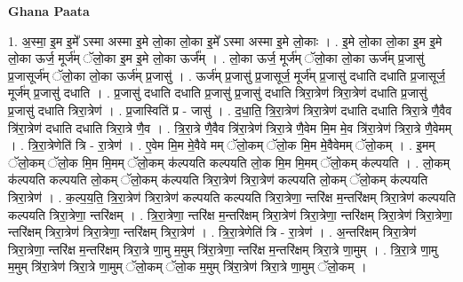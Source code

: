 \documentclass[17pt]{extarticle}
\begin{document}
\textbf{Ghana Paata } \newline

1. अ॒स्मा॒ इ॒म इ॒मे᳚ ऽस्मा अस्मा इ॒मे लो॒का लो॒का इ॒मे᳚ ऽस्मा अस्मा इ॒मे लो॒काः । . इ॒मे लो॒का लो॒का इ॒म इ॒मे लो॒का ऊर्ज॒ मूर्ज॑म् ॅलो॒का इ॒म इ॒मे लो॒का ऊर्ज᳚म् । . लो॒का ऊर्ज॒ मूर्ज॑म् ॅलो॒का लो॒का ऊर्ज॑म् प्र॒जासु॑ प्र॒जासूर्ज॑म् ॅलो॒का लो॒का ऊर्ज॑म् प्र॒जासु॑ । . ऊर्ज॑म् प्र॒जासु॑ प्र॒जासूर्ज॒ मूर्ज॑म् प्र॒जासु॑ दधाति दधाति प्र॒जासूर्ज॒ मूर्ज॑म् प्र॒जासु॑ दधाति । . प्र॒जासु॑ दधाति दधाति प्र॒जासु॑ प्र॒जासु॑ दधाति त्रिरा॒त्रेण॑ त्रिरा॒त्रेण॑ दधाति प्र॒जासु॑ प्र॒जासु॑ दधाति त्रिरा॒त्रेण॑ । . प्र॒जास्विति॑ प्र - जासु॑ । . द॒धा॒ति॒ त्रि॒रा॒त्रेण॑ त्रिरा॒त्रेण॑ दधाति दधाति त्रिरा॒त्रे णै॒वैव त्रि॑रा॒त्रेण॑ दधाति दधाति त्रिरा॒त्रे णै॒व । . त्रि॒रा॒त्रे णै॒वैव त्रि॑रा॒त्रेण॑ त्रिरा॒त्रे णै॒वेम मि॒म मे॒व त्रि॑रा॒त्रेण॑ त्रिरा॒त्रे णै॒वेमम् । . त्रि॒रा॒त्रेणेति॑ त्रि - रा॒त्रेण॑ । . ए॒वेम मि॒म मे॒वैवे मम् ॅलो॒कम् ॅलो॒क मि॒म मे॒वैवेमम् ॅलो॒कम् । . इ॒मम् ॅलो॒कम् ॅलो॒क मि॒म मि॒मम् ॅलो॒कम् क॑ल्पयति कल्पयति लो॒क मि॒म मि॒मम् ॅलो॒कम् क॑ल्पयति । . लो॒कम् क॑ल्पयति कल्पयति लो॒कम् ॅलो॒कम् क॑ल्पयति त्रिरा॒त्रेण॑ त्रिरा॒त्रेण॑ कल्पयति लो॒कम् ॅलो॒कम् क॑ल्पयति त्रिरा॒त्रेण॑ । . क॒ल्प॒य॒ति॒ त्रि॒रा॒त्रेण॑ त्रिरा॒त्रेण॑ कल्पयति कल्पयति त्रिरा॒त्रेणा॒ न्तरि॑क्ष म॒न्तरि॑क्षम् त्रिरा॒त्रेण॑ कल्पयति कल्पयति त्रिरा॒त्रेणा॒ न्तरि॑क्षम् । . त्रि॒रा॒त्रेणा॒ न्तरि॑क्ष म॒न्तरि॑क्षम् त्रिरा॒त्रेण॑ त्रिरा॒त्रेणा॒ न्तरि॑क्षम् त्रिरा॒त्रेण॑ त्रिरा॒त्रेणा॒ न्तरि॑क्षम् त्रिरा॒त्रेण॑ त्रिरा॒त्रेणा॒ न्तरि॑क्षम् त्रिरा॒त्रेण॑ । . त्रि॒रा॒त्रेणेति॑ त्रि - रा॒त्रेण॑ । . अ॒न्तरि॑क्षम् त्रिरा॒त्रेण॑ त्रिरा॒त्रेणा॒ न्तरि॑क्ष म॒न्तरि॑क्षम् त्रिरा॒त्रे णा॒मु म॒मुम् त्रि॑रा॒त्रेणा॒ न्तरि॑क्ष म॒न्तरि॑क्षम् त्रिरा॒त्रे णा॒मुम् । . त्रि॒रा॒त्रे णा॒मु म॒मुम् त्रि॑रा॒त्रेण॑ त्रिरा॒त्रे णा॒मुम् ॅलो॒कम् ॅलो॒क म॒मुम् त्रि॑रा॒त्रेण॑ त्रिरा॒त्रे णा॒मुम् ॅलो॒कम् । \newline
\end{document}
